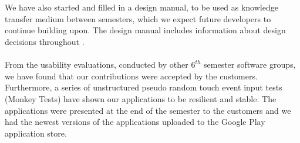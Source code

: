 \\\\
We have also started and filled in a design manual, to be used as knowledge transfer medium between semesters, which we expect future \giraf developers to continue building upon. The design manual includes information about design decisions throughout \giraf.  
\\\\
From the usability evaluations, conducted by other $6^{th}$ semester software groups, we have found that our contributions were accepted by the customers. Furthermore, a series of unstructured pseudo random touch event input tests (Monkey Tests) have shown our applications to be resilient and stable. The applications were presented at the end of the semester to the customers and we had the newest versions of the applications uploaded to the Google Play application store. 
